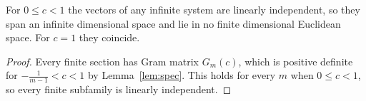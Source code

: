\begin{theorem}\label{thm:main}
For $0\le c<1$ the vectors of any infinite system are linearly independent, so they span an infinite dimensional space and lie in no finite dimensional Euclidean space. For $c=1$ they coincide.
\end{theorem}
\begin{proof}
Every finite section has Gram matrix $G_m(c)$, which is positive definite for $-\frac1{m-1}<c<1$ by Lemma~\ref{lem:spec}. This holds for every $m$ when $0\le c<1$, so every finite subfamily is linearly independent.
\end{proof}
